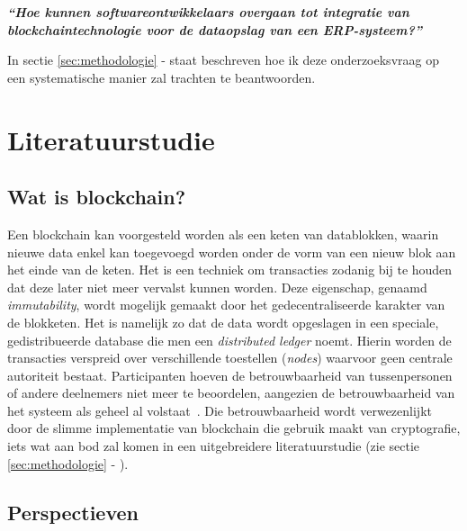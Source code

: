 \begin{center}
	\textit{\textbf{``Hoe kunnen softwareontwikkelaars overgaan tot integratie van blockchaintechnologie voor de dataopslag van een ERP-systeem?''}}
\end{center}

In sectie \ref{sec:methodologie} -  staat beschreven hoe ik deze onderzoeksvraag op een systematische manier zal trachten te beantwoorden.

\vfil \break



\section{Literatuurstudie}
\label{sec:state-of-the-art}

\subsection{Wat is blockchain?}
\label{sub:wat-is-blockchain}

Een blockchain kan voorgesteld worden als een keten van datablokken, waarin nieuwe data enkel kan toegevoegd worden onder de vorm van een nieuw blok aan het einde van de keten. Het is een techniek om transacties zodanig bij te houden dat deze later niet meer vervalst kunnen worden. Deze eigenschap, genaamd \textit{immutability}, wordt mogelijk gemaakt door het gedecentraliseerde karakter van de blokketen. Het is namelijk zo dat de data wordt opgeslagen in een speciale, gedistribueerde database die men een \textit{distributed ledger} noemt. Hierin worden de transacties verspreid over verschillende toestellen (\textit{nodes}) waarvoor geen centrale autoriteit bestaat. Participanten hoeven de betrouwbaarheid van tussenpersonen of andere deelnemers niet meer te beoordelen, aangezien de betrouwbaarheid van het systeem als geheel al volstaat~\autocite{Nofer2017}. Die betrouwbaarheid wordt verwezenlijkt door de slimme implementatie van blockchain die gebruik maakt van cryptografie, iets wat aan bod zal komen in een uitgebreidere literatuurstudie (zie sectie \ref{sec:methodologie} - ).



\subsection{Perspectieven}
\label{sub:perspectieven}

